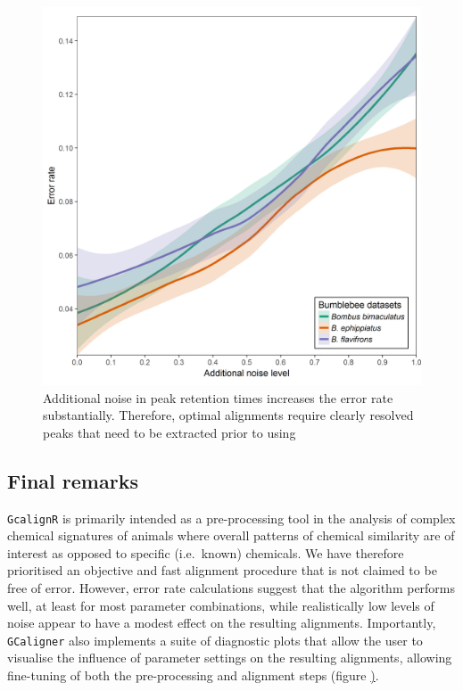 \begin{figure}[htbp]
\centering
\includegraphics[width=13cm]{figures/noise_simulation}
\caption{Additional noise in peak retention times increases the error rate substantially. Therefore, optimal alignments require clearly resolved peaks that need to be extracted prior to using }
\label{figure:noise}
\end{figure}

\subsection{Final remarks}\label{final-remarks}

\texttt{GcalignR} is primarily intended as a pre-processing tool in the
analysis of complex chemical signatures of animals where overall
patterns of chemical similarity are of interest as opposed to specific
(i.e.~known) chemicals. We have therefore prioritised an objective and
fast alignment procedure that is not claimed to be free of error.
However, error rate calculations suggest that the algorithm performs
well, at least for most parameter combinations, while realistically low
levels of noise appear to have a modest effect on the resulting
alignments. Importantly, \texttt{GCaligner} also implements a suite of
diagnostic plots that allow the user to visualise the influence of
parameter settings on the resulting alignments, allowing fine-tuning of
both the pre-processing and alignment steps (figure
\href{figure:workflow}).

